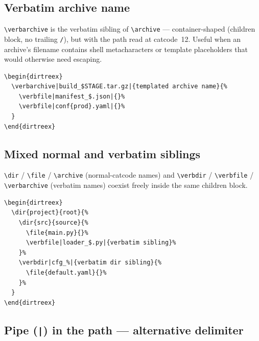 \documentclass[11pt]{article}
\begin{document}
\subsection{Verbatim archive name}

\verb|\verbarchive| is the verbatim sibling of \verb|\archive| --- container-shaped (children block, no trailing \verb|/|), but with the path read at catcode~12. Useful when an archive's filename contains shell metacharacters or template placeholders that would otherwise need escaping.

\begin{Verbatim}
\begin{dirtreex}
  \verbarchive|build_$STAGE.tar.gz|{templated archive name}{%
    \verbfile|manifest_$.json|{}%
    \verbfile|conf{prod}.yaml|{}%
  }
\end{dirtreex}
\end{Verbatim}


\subsection{Mixed normal and verbatim siblings}

\verb|\dir| / \verb|\file| / \verb|\archive| (normal-catcode names) and \verb|\verbdir| / \verb|\verbfile| / \verb|\verbarchive| (verbatim names) coexist freely inside the same children block.

\begin{Verbatim}
\begin{dirtreex}
  \dir{project}{root}{%
    \dir{src}{source}{%
      \file{main.py}{}%
      \verbfile|loader_$.py|{verbatim sibling}%
    }%
    \verbdir|cfg_%|{verbatim dir sibling}{%
      \file{default.yaml}{}%
    }%
  }
\end{dirtreex}
\end{Verbatim}


\subsection{Pipe (\texttt{|}) in the path --- alternative delimiter}
\end{document}
